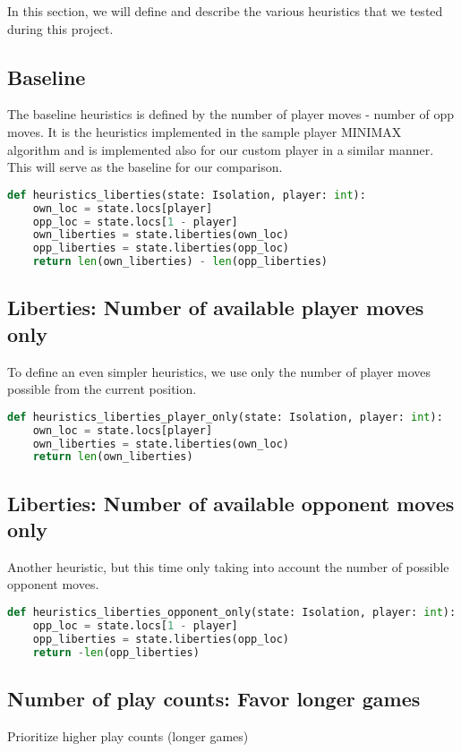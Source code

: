 \documentclass[aps,prd,notitlepage,floatfix,superscriptaddress,groupedaddress,nofootinbib]{revtex4-1}
\begin{document}
In this section, we will define and describe the various heuristics that we tested during this project.

\subsection{Baseline}
The baseline heuristics is defined by the number of player moves - number of opp moves. It is the heuristics implemented in the sample player MINIMAX algorithm and is implemented also for our custom player in a similar manner. This will serve as the baseline for our comparison.

\begin{lstlisting}[language=python]
def heuristics_liberties(state: Isolation, player: int):
    own_loc = state.locs[player]
    opp_loc = state.locs[1 - player]
    own_liberties = state.liberties(own_loc)
    opp_liberties = state.liberties(opp_loc)
    return len(own_liberties) - len(opp_liberties)
\end{lstlisting}

\subsection*{Liberties: Number of available player moves only}
To define an even simpler heuristics, we use only the number of player moves possible from the current position.

\begin{lstlisting}[language=python]
def heuristics_liberties_player_only(state: Isolation, player: int):
    own_loc = state.locs[player]
    own_liberties = state.liberties(own_loc)
    return len(own_liberties)
\end{lstlisting}

\subsection*{Liberties: Number of available opponent moves only}
Another heuristic, but this time only taking into account the number of possible opponent moves.

\begin{lstlisting}[language=python]
def heuristics_liberties_opponent_only(state: Isolation, player: int):
    opp_loc = state.locs[1 - player]
    opp_liberties = state.liberties(opp_loc)
    return -len(opp_liberties)
\end{lstlisting}

\subsection*{Number of play counts: Favor longer games}
Prioritize higher play counts (longer games)
\end{document}
